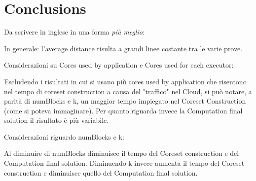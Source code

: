 \documentclass[10pt]{article}
\begin{document}
\section{Conclusions}
Da scrivere in inglese in una forma \textit{pi\`{u} meglio}:

In generale: l'average distance risulta a grandi linee costante tra le varie prove.

Considerazioni su Cores used by application e Cores used for each executor:

Escludendo i risultati in cui si usano pi\`{u} cores used by application che risentono nel tempo di coreset construction a causa del "traffico" nel Cloud, si pu\`{o} notare, a parità di numBlocks e k, un maggior tempo impiegato nel Coreset Construction (come si poteva immaginare). Per quanto riguarda invece la Computation final solution il risultato è più variabile.

Considerazioni riguardo numBlocks e k:

Al diminuire di numBlocks diminuisce il tempo del Coreset construction e del Computation final solution. Diminuendo k invece aumenta il tempo del Coreset construction e diminuisce quello del Computation final solution.





 
\end{document}
